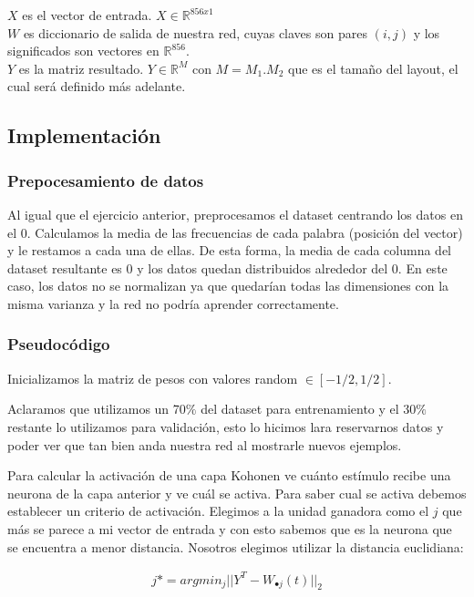 $X$ es el vector de entrada. $X \in \mathbb{R}^{856x1}$ \\

$W$ es diccionario de salida de nuestra red, cuyas claves son pares $(i,j)$ y los significados son vectores en $\mathbb{R}^{856}$.\\

$Y$ es la matriz resultado. $Y \in \mathbb{R}^{M}$ con $M = M_{1} . M_{2}$ que es el tamaño del layout, el cual será definido más adelante.\\

\subsection{Implementación}

\subsubsection{Prepocesamiento de datos}
Al igual que el ejercicio anterior, preprocesamos el dataset centrando los datos en el 0. Calculamos la media de las frecuencias de cada palabra (posición del vector) y le restamos a cada una de ellas. De esta forma, la media de cada columna del dataset resultante es 0 y los datos quedan distribuidos alrededor del 0. En este caso, los datos no se normalizan ya que quedarían todas las dimensiones con la misma varianza y la red no podría aprender correctamente.

\subsubsection{Pseudocódigo}

Inicializamos la matriz de pesos con valores random $\in[-1/2, 1/2]$.

Aclaramos que utilizamos un 70$\%$ del dataset para entrenamiento y el 30$\%$ restante lo utilizamos para validación, esto lo hicimos lara reservarnos datos y poder ver que tan bien anda nuestra red al mostrarle nuevos ejemplos.

Para calcular la activación de una capa Kohonen ve cuánto estímulo recibe una neurona de la capa anterior y ve cuál se activa. Para saber cual se activa debemos establecer un criterio de activación. Elegimos a la unidad ganadora como el $j$ que más se parece a mi vector de entrada y con esto sabemos que es la neurona que se encuentra a menor distancia. Nosotros elegimos utilizar la distancia euclidiana:

\begin{align*}
		j* = argmin_{j}||Y^{T} - W_{\bullet j}(t)||_{2}
\end{align*}


